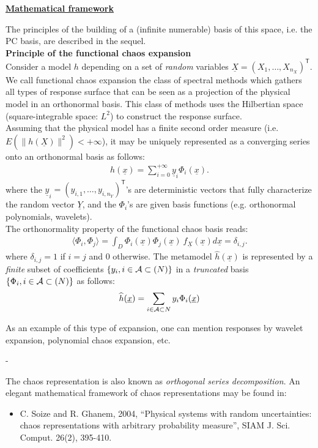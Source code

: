 {  \underline{\textbf{Mathematical framework}} \vspace{2mm}

  The principles of the building of a (infinite numerable) basis of this space, i.e. the PC basis, are described in the sequel. \\
  \textbf{Principle of the functional chaos expansion}\\

  Consider a model $h$ depending on a set of \emph{random} variables $\underline{X} = (X_1,\dots,X_{n_X})^{\textsf{T}}$. We call functional chaos expansion the class of spectral methods which gathers all types of response surface that can be seen as a projection of the physical model in an orthonormal basis. This class of methods uses the Hilbertian space (square-integrable space: $L^2$) to construct the response surface.\\

  Assuming that the physical model has a finite second order measure (i.e. $E\left( \|h(\underline{X})\|^2\right)< + \infty$), it may be uniquely represented as a converging series onto an orthonormal basis as follows:
  \begin{align*}
    h(\underline{x})= \sum_{i=0}^{+\infty}  \underline{y}_{i}\Phi_{i}(\underline{x}).
  \end{align*}
  where the $\underline{y}_{i} = (y_{i,1},\dots,y_{i,n_Y})^{\textsf{T}}$'s are deterministic vectors that fully characterize the random vector $\underline{Y}$, and the $\Phi_{i}$'s are given basis functions (e.g. orthonormal polynomials, wavelets). \\


  The orthonormality property of the functional chaos basis reads:
  \begin{align*}
    \langle \Phi_{i},\Phi_{j}\rangle = \int_{D}\Phi_{i}(\underline{x}) \Phi_{j}(\underline{x})~f_{\underline{X}}(\underline{x}) d \underline{x} = \delta_{i,j}.
  \end{align*}
  where $\delta_{i,j} =1$ if $i=j$ and 0 otherwise. The metamodel $\widehat{h}(\underline{x})$ is represented by a \emph{finite} subset of coefficients $\{y_{i}, i \in {\mathcal A} \subset (N)\}$ in a \emph{truncated} basis $\{\Phi_{i}, i \in {\mathcal A} \subset (N)\}$ as follows:
  \begin{align*}
    \widehat{h}(\underline{x})= \sum_{i \in {\mathcal A} \subset N}  y_{i}\Phi_{i}(\underline{x})
  \end{align*}


  As an example of this type of expansion, one can mention responses by wavelet expansion, polynomial chaos expansion, etc.
}
{
  -
}


\Methodology{}
            {The chaos representation is also known as \emph{orthogonal series decomposition}. An elegant mathematical framework of chaos representations may be found in:
              \begin{itemize}
              \item C. Soize and R. Ghanem, 2004, ``Physical systems with random uncertainties: chaos representations
                with arbitrary probability measure'', SIAM J. Sci. Comput. 26(2), 395-410.
              \end{itemize}
            }
